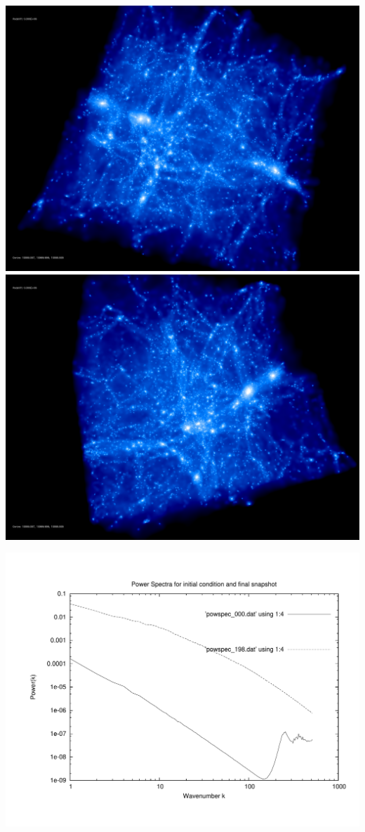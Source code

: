 \includegraphics[scale=0.1]{stages_13/rotate_00074.jpg} 
\includegraphics[scale=0.1]{stages_13/rotate_00131.jpg}

\includegraphics[scale=0.5]{stages_13/plot_powspec_stages_13}

